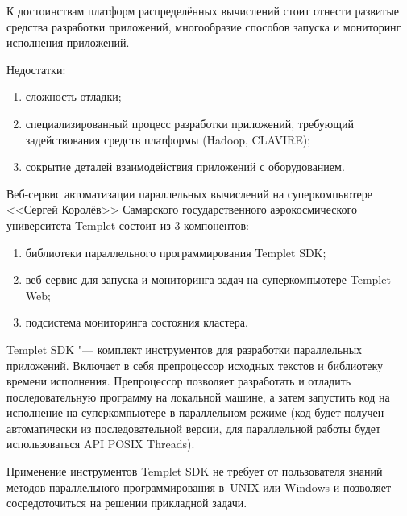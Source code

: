К достоинствам платформ распределённых вычислений стоит отнести развитые средства разработки приложений, многообразие способов  запуска и мониторинг исполнения приложений.

Недостатки:

\begin{enumerate}

\item сложность отладки;

\item специализированный процесс разработки приложений, требующий задействования средств платформы (Hadoop, CLAVIRE);

\item сокрытие деталей взаимодействия приложений с оборудованием.

\end{enumerate}



\smallskip




Веб-сервис автоматизации параллельных вычислений на суперкомпьютере <<Сергей Королёв>> Самарского государственного аэрокосмического университета  Templet состоит из 3 компонентов:

\begin{enumerate}

\item библиотеки параллельного программирования Templet SDK;

\item веб-сервис для запуска и мониторинга задач на суперкомпьютере Templet Web;

\item подсистема мониторинга состояния кластера.

\end{enumerate}



Templet SDK "--- комплект инструментов для разработки параллельных приложений. Включает в себя препроцессор исходных текстов и библиотеку времени исполнения. Препроцессор позволяет разработать и отладить последовательную программу на локальной машине, а затем запустить код на исполнение на суперкомпьютере в параллельном режиме (код будет получен автоматически из последовательной версии, для параллельной работы будет использоваться API POSIX Threads). 

Применение инструментов Templet SDK не требует от пользователя знаний методов параллельного программирования в~UNIX или Windows и позволяет сосредоточиться на решении прикладной задачи.



